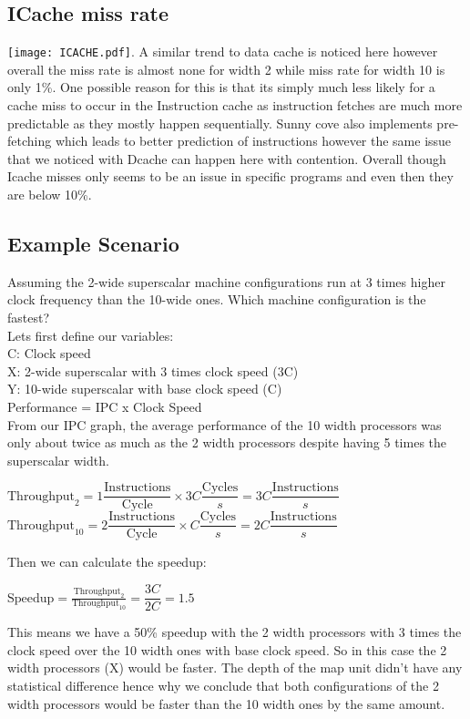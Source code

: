 \documentclass{article}
\begin{document}
\subsection*{ICache miss rate}
\texttt{[image: ICACHE.pdf]}.
A similar trend to data cache is noticed here however overall the miss rate is almost none for width 2 while miss rate for width 10 is only 1\%. One possible reason for this is that its simply much less likely for a cache miss to occur in the Instruction cache as instruction fetches are much more predictable as they mostly happen sequentially. Sunny cove also implements pre-fetching which leads to better prediction of instructions however the same issue that we noticed with Dcache can happen here with contention. Overall though Icache misses only seems to be an issue in specific programs and even then they are below 10\%.
\begin{minipage}{\textwidth}
\subsection*{Example Scenario}
Assuming the 2-wide superscalar machine configurations run at 3 times higher clock frequency than the 10-wide ones. Which machine configuration is the fastest?\\
Lets first define our variables:\\
C: Clock speed \\
X: 2-wide superscalar with 3 times clock speed (3C) \\
Y: 10-wide superscalar with base clock speed (C) \\
Performance = IPC x Clock Speed \\
From our IPC graph, the average performance of the 10 width processors was only about twice as much as the 2 width processors despite having 5 times the superscalar width. \\
\begin{center}
  $\text{Throughput}_2 = 1\dfrac{\text{Instructions}}{\text{Cycle}} \times 3C\dfrac{\text{Cycles}}{s} = 3C\dfrac{\text{Instructions}}{s}$ \\
  $\text{Throughput}_{10} = 2\dfrac{\text{Instructions}}{\text{Cycle}} \times C\dfrac{\text{Cycles}}{s} = 2C\dfrac{\text{Instructions}}{s}$
\end{center}
Then we can calculate the speedup:
\begin{center}
  $\text{Speedup} = \frac{\text{Throughput}_2}{\text{Throughput}_{10}} = \dfrac{3C}{2C} = 1.5$
\end{center}
This means we have a 50\% speedup with the 2 width processors with 3 times the clock speed over the 10 width ones with base clock speed. So in this case the 2 width processors (X) would be faster. The depth of the map unit didn't have any statistical difference hence why we conclude that both configurations of the 2 width processors would be faster than the 10 width ones by the same amount. 
\end{minipage}
\end{document}
